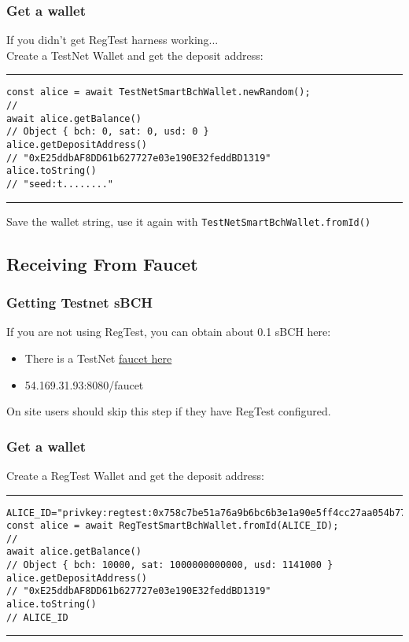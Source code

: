 \documentclass{beamer}
\begin{document}
\begin{frame}[fragile]
    \frametitle{Get a wallet}
    If you \alert{didn't get RegTest} harness working... \\
    Create a TestNet Wallet and get the deposit address:
    \rule{\textwidth}{0.9pt}
    \tiny
    \begin{verbatim}
const alice = await TestNetSmartBchWallet.newRandom();
// 
await alice.getBalance()
// Object { bch: 0, sat: 0, usd: 0 }
alice.getDepositAddress()
// "0xE25ddbAF8DD61b627727e03e190E32feddBD1319"
alice.toString()
// "seed:t........"
    \end{verbatim}
\rule{\textwidth}{0.9pt}

Save the wallet string, use it again with \texttt{TestNetSmartBchWallet.fromId()}
\end{frame}

\subsection[Getting Money]{Receiving From Faucet}

\begin{frame}[fragile]
    \frametitle{Getting Testnet sBCH}
If you are \alert{not} using RegTest, you can obtain about 0.1 sBCH here:
    \begin{itemize}
    \item
    There is a TestNet \href{http://54.169.31.93:8080/faucet}{faucet here}
    \item
    54.169.31.93:8080/faucet    
    \end{itemize}
On site users should skip this step if they have RegTest configured.
\end{frame}


\begin{frame}[fragile]
    \frametitle{Get a wallet}
    Create a RegTest Wallet and get the deposit address:
    \rule{\textwidth}{0.9pt}
    \tiny
    \begin{verbatim}
ALICE_ID="privkey:regtest:0x758c7be51a76a9b6bc6b3e1a90e5ff4cc27aa054b77b7acb6f4f08a219c1ce45"
const alice = await RegTestSmartBchWallet.fromId(ALICE_ID);
// 
await alice.getBalance()
// Object { bch: 10000, sat: 1000000000000, usd: 1141000 }
alice.getDepositAddress()
// "0xE25ddbAF8DD61b627727e03e190E32feddBD1319"
alice.toString()
// ALICE_ID
    \end{verbatim}
\rule{\textwidth}{0.9pt}
\end{frame}
\end{document}
